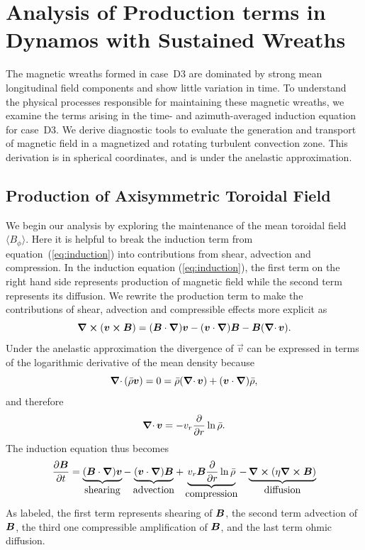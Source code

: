\chapter{Analysis of Production terms in Dynamos with Sustained Wreaths}
\label{chapter:dynamo production}
\label{sec:dynamo_production}
The magnetic wreaths formed in case~D3 are dominated by strong 
mean longitudinal field components and show little variation in time. 
To understand the physical processes responsible
for maintaining these magnetic wreaths, we examine the terms arising in
the time- and azimuth-averaged induction equation for case~D3.  
We derive diagnostic tools to evaluate the generation and transport of 
magnetic field in a magnetized and rotating turbulent convection
zone.  This derivation is in spherical coordinates, and is under the
anelastic approximation.

\section{Production of Axisymmetric Toroidal Field}
We begin our analysis by exploring the maintenance of the mean
toroidal field $\langle B_\phi \rangle$.  Here it is helpful to break
the induction term from equation~(\ref{eq:induction}) into
contributions from shear, advection and compression.
In the induction equation (\ref{eq:induction}), the first term on
the right hand side represents production of magnetic field while the
second term represents its diffusion.  We rewrite the production
term to make the contributions of shear, advection and compressible
effects more explicit as
\begin{equation}
  \mbox{\boldmath $\nabla$}\boldsymbol{\times}(\boldsymbol{v}\boldsymbol{\times}\boldsymbol{B}) = (\boldsymbol{B}\cdot\mbox{\boldmath $\nabla$})\boldsymbol{v}-(\boldsymbol{v}\cdot\mbox{\boldmath $\nabla$})\boldsymbol{B}-\boldsymbol{B}(\mbox{$\boldsymbol{\nabla} \cdot\,$}\boldsymbol{v}).
\end{equation}
Under the anelastic approximation the divergence of $\vec{v}$ can be
expressed in terms of the logarithmic derivative of the mean density because
\begin{equation}
  \mbox{$\boldsymbol{\nabla} \cdot\,$}(\bar{\rho} \boldsymbol{v})=0=\bar{\rho}(\mbox{$\boldsymbol{\nabla} \cdot\,$} \boldsymbol{v})+(\boldsymbol{v}\cdot\mbox{\boldmath $\nabla$})\bar{\rho}, \nonumber
\end{equation}
and therefore
\begin{equation}
  \mbox{$\boldsymbol{\nabla} \cdot\,$}\boldsymbol{v}=-v_r\frac{\partial}{\partial r}\ln \bar{\rho}.
\end{equation}
The induction equation thus becomes
\begin{equation}\label{eq:ind2}
\frac{\partial \boldsymbol{B}}{\partial t}=\underbrace{(\boldsymbol{B}\cdot\mbox{\boldmath $\nabla$})\boldsymbol{v}}_{\mbox{shearing}}
                   -\underbrace{(\boldsymbol{v}\cdot\mbox{\boldmath $\nabla$})\boldsymbol{B}}_{\mbox{advection}}
		   +\underbrace{v_r\boldsymbol{B}\frac{\partial}{\partial r}\ln \bar{\rho}}_{\mbox{compression}}
		   -\underbrace{\mbox{\boldmath $\nabla$}\boldsymbol{\times}(\eta\mbox{\boldmath $\nabla$}\boldsymbol{\times}\boldsymbol{B})}_{\mbox{diffusion}}
\end{equation}
As labeled, the first term represents shearing of $\boldsymbol{B}$, the second
term advection of $\boldsymbol{B}$, the third one compressible amplification
of $\boldsymbol{B}$, and the last term ohmic diffusion.

